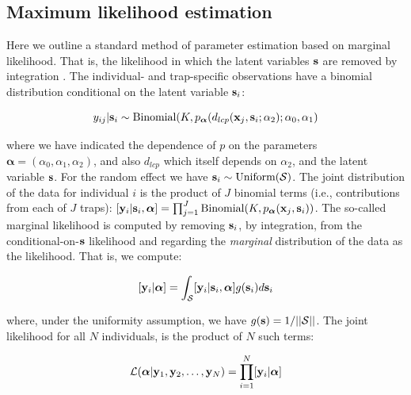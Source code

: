 \documentclass[12pt]{article}
\begin{document}
\begin{spacing}{1.8}
\section{Maximum likelihood estimation}
\label{sec.mle}

Here we outline a standard method of parameter estimation based on
marginal likelihood. That is, the likelihood in which the latent
variables ${\bf s}$ are removed by integration \citep{borchers_efford:2008}.
The individual- and trap-specific observations have a binomial
distribution conditional on the latent variable ${\bf s}_{i}$:

\begin{equation}
  y_{ij}| {\bf s}_{i} \sim \mbox{Binomial}(K, p_{\bm \alpha}(d_{lcp}({\bf x}_{j},{\bf s}_{i};\alpha_{2}); \alpha_{0}, \alpha_{1})
\label{mle.eq.cond-on-s}
\end{equation}

{\flushleft where} we have indicated the dependence of $p$ on the parameters
${\bm \alpha} =(\alpha_{0},\alpha_{1},\alpha_{2})$, and also $d_{lcp}$ which
itself depends on $\alpha_{2}$, and the latent variable ${\bf s}$.
For the random effect we have ${\bf s}_{i} \sim  \mbox{Uniform}({\cal
  S})$.
The joint distribution of the data for individual $i$ is the product
of $J$ binomial terms (i.e., contributions from each of $J$ traps):
$[{\bf y}_{i} | {\bf s}_{i} , {\bm \alpha}] = 
  \prod_{j=1}^{J} \mbox{Binomial}(K, p_{\bm \alpha}({\bf x}_{j},{\bf s}_{i}) )$.
 The so-called marginal likelihood is computed by removing
${\bf s}_{i}$, by integration,  from the conditional-on-${\bf s}$
likelihood and regarding the {\it marginal} distribution of the data
as the likelihood. That
is, we compute:

\[
  [{\bf y}_{i}|{\bm \alpha}] =
\int_{{\cal S}}  [ {\bf y}_{i} |{\bf s}_{i},{\bm \alpha}] g({\bf s}_{i}) d{\bf s}_{i}
\]

{\flushleft where}, under the uniformity assumption, we have
$g({\bf s}) = 1/||{\cal S}||$.
The joint likelihood for all $N$ individuals,
is the product of $N$ such terms:

\[
{\cal L}({\bm \alpha} | {\bf y}_{1},{\bf y}_{2},\ldots, {\bf y}_{N}) 
= \prod_{i=1}^{N} [{\bf y}_{i}|{\bm \alpha}]
\]


\end{spacing}
\end{document}
